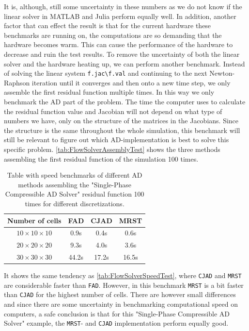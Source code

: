 It is, although, still some uncertainty in these numbers as we do not know if the linear solver in MATLAB and Julia perform equally well. In addition, another factor that can effect the result is that for the current hardware these benchmarks are running on, the computations are so demanding that the hardware becomes warm. This can cause the performance of the hardware to decrease and ruin the test results. To remove the uncertainty of both the linear solver and the hardware heating up, we can perform another benchmark. Instead of solving the linear system \texttt{f.jac\textbackslash f.val} and continuing to the next Newton-Raphson iteration until it converges and then onto a new time step, we only assemble the first residual function multiple times. In this way we only benchmark the AD part of the problem. The time the computer uses to calculate the residual function value and Jacobian will not depend on what type of numbers we have, only on the structure of the matrices in the Jacobians. Since the structure is the same throughout the whole simulation, this benchmark will still be relevant to figure out which AD-implementation is best to solve this specific problem. \autoref{tab:FlowSolverAssemblyTest} shows the three methods assembling the first residual function of the simulation 100 times.
\begin{table}[htb]
    \centering
    \caption{Table with speed benchmarks of different AD methods assembling the "Single-Phase Compressible AD Solver" residual function 100 times for different discretizations.}
    \label{tab:FlowSolverAssemblyTest}
    \def\arraystretch{1.5}
    \begin{tabular}{cccc}
    \textbf{Number of cells} & \textbf{FAD} & \textbf{CJAD} & \textbf{MRST}\\
        \hline
         $10\times10\times10$ & 0.9s & 0.4s & 0.6s  \\  
         $20\times20\times20$ & 9.3s & 4.0s & 3.6s \\ 
         $30\times30\times30$ & 44.2s& 17.2s& 16.5s \\ \hline
    \end{tabular}
\end{table}
It shows the same tendency as \autoref{tab:FlowSolverSpeedTest}, where \texttt{CJAD} and \texttt{MRST} are considerable faster than \texttt{FAD}. However, in this benchmark \texttt{MRST} is a bit faster than \texttt{CJAD} for the highest number of cells. There are however small differences and since there are some uncertainty in benchmarking computational speed on computers, a safe conclusion is that for this "Single-Phase Compressible AD Solver" example, the \texttt{MRST}- and \texttt{CJAD} implementation perform equally good.
